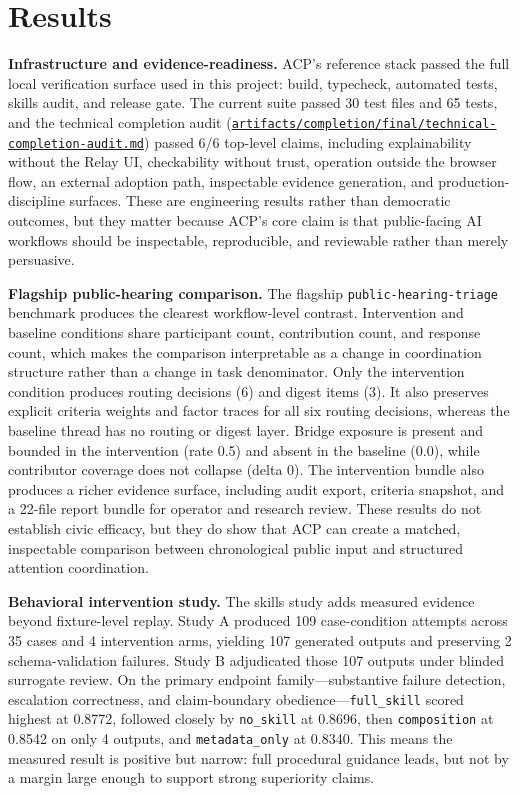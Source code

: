 \documentclass[11pt]{article}
\newcommand{\repobase}{https://github.com/davidkimai/acp}
\newcommand{\repofile}[2]{\href{\repobase/blob/main/#1}{\nolinkurl{#2}}}
\begin{document}
\section{Results}

\textbf{Infrastructure and evidence-readiness.} ACP's reference stack passed the full local verification surface used in this project: build, typecheck, automated tests, skills audit, and release gate. The current suite passed 30 test files and 65 tests, and the technical completion audit (\repofile{artifacts/completion/final/technical-completion-audit.md}{artifacts/completion/final/technical-completion-audit.md}) passed 6/6 top-level claims, including explainability without the Relay UI, checkability without trust, operation outside the browser flow, an external adoption path, inspectable evidence generation, and production-discipline surfaces. These are engineering results rather than democratic outcomes, but they matter because ACP's core claim is that public-facing AI workflows should be inspectable, reproducible, and reviewable rather than merely persuasive.

\vspace{0.1in}
\textbf{Flagship public-hearing comparison.} The flagship \texttt{public-hearing-triage} benchmark produces the clearest workflow-level contrast. Intervention and baseline conditions share participant count, contribution count, and response count, which makes the comparison interpretable as a change in coordination structure rather than a change in task denominator. Only the intervention condition produces routing decisions (6) and digest items (3). It also preserves explicit criteria weights and factor traces for all six routing decisions, whereas the baseline thread has no routing or digest layer. Bridge exposure is present and bounded in the intervention (rate 0.5) and absent in the baseline (0.0), while contributor coverage does not collapse (delta 0). The intervention bundle also produces a richer evidence surface, including audit export, criteria snapshot, and a 22-file report bundle for operator and research review. These results do not establish civic efficacy, but they do show that ACP can create a matched, inspectable comparison between chronological public input and structured attention coordination.

\vspace{0.1in}
\textbf{Behavioral intervention study.} The skills study adds measured evidence beyond fixture-level replay. Study A produced 109 case-condition attempts across 35 cases and 4 intervention arms, yielding 107 generated outputs and preserving 2 schema-validation failures. Study B adjudicated those 107 outputs under blinded surrogate review. On the primary endpoint family---substantive failure detection, escalation correctness, and claim-boundary obedience---\texttt{full\_skill} scored highest at 0.8772, followed closely by \texttt{no\_skill} at 0.8696, then \texttt{composition} at 0.8542 on only 4 outputs, and \texttt{metadata\_only} at 0.8340. This means the measured result is positive but narrow: full procedural guidance leads, but not by a margin large enough to support strong superiority claims.
\end{document}
